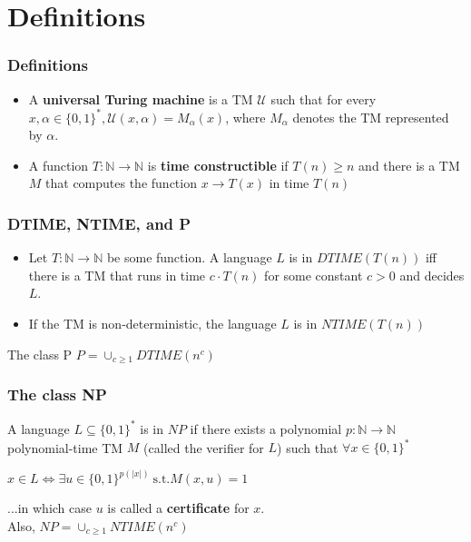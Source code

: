 \documentclass{beamer}
\begin{document}

\section{Definitions}

\begin{frame}

\frametitle{Definitions}

\begin{itemize}
\item A \textbf{universal Turing machine} is a TM $\mathcal{U}$ such that for every $x, \alpha \in \{0,1\}^*, \mathcal{U}(x, \alpha) = M_{\alpha}(x)$, where $M_{\alpha}$ denotes the TM represented by $\alpha$.
\item A function $T: \mathbb{N} \to \mathbb{N}$ is \textbf{time constructible} if $T(n) \geq n$ and there is a TM $M$ that computes the function $x \to T(x)$ in time $T(n)$

\end{itemize}

\end{frame}

\begin{frame}

\frametitle{DTIME, NTIME, and P}

\begin{itemize}
\item Let $T: \mathbb{N} \to \mathbb{N}$ be some function. A language $L$ is in $DTIME(T(n))$ iff there is a TM that runs in time $c \cdot T(n)$ for some constant $c > 0$ and decides $L$.
\item If the TM is non-deterministic, the language $L$ is in $NTIME(T(n))$
\end{itemize}

\begin{block}{The class P}
$P = \cup_{c \geq 1} DTIME(n^c)$
\end{block}


\end{frame}

\begin{frame}

\frametitle{The class NP}

A language $L \subseteq \{0,1\}^*$ is in $NP$ if there exists a polynomial $p: \mathbb{N} \to \mathbb{N}$ polynomial-time TM $M$ (called the verifier for $L$) such that $\forall x \in \{0,1\}^*$

\begin{center}
$x \in L \iff \exists u \in \{0,1\}^{p(|x|)}\ \textrm{s.t.} M(x,u) = 1$
\end{center}

...in which case $u$ is called a \textbf{certificate} for $x$.\\
Also, $NP = \cup_{c \geq 1} NTIME(n^c)$

\end{frame}
\end{document}
